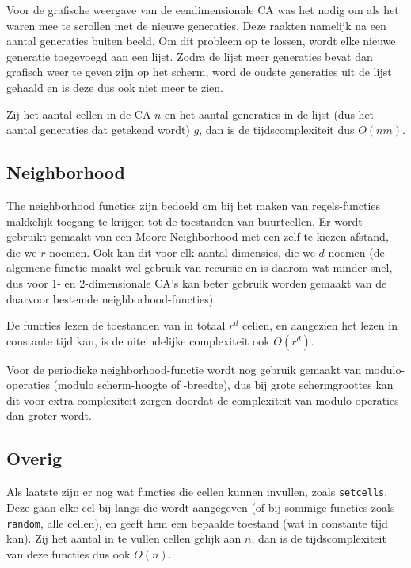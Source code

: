 \documentclass{article}
\begin{document}
Voor de grafische weergave van de eendimensionale CA was het nodig om als het waren mee te scrollen met de nieuwe generaties. Deze raakten namelijk na een aantal generaties buiten beeld. Om dit probleem op te lossen, wordt elke nieuwe generatie toegevoegd aan een lijst. Zodra de lijst meer generaties bevat dan grafisch weer te geven zijn op het scherm, word de oudste generaties uit de lijst gehaald en is deze dus ook niet meer te zien.

Zij het aantal cellen in de CA $n$ en het aantal generaties in de lijst (dus het aantal generaties dat getekend wordt) $g$, dan is de tijdscomplexiteit dus $O(nm)$.

\subsection{Neighborhood}
The neighborhood functies zijn bedoeld om bij het maken van regels-functies makkelijk toegang te krijgen tot de toestanden van buurtcellen. Er wordt gebruikt gemaakt van een Moore-Neighborhood met een zelf te kiezen afstand, die we $r$ noemen. Ook kan dit voor elk aantal dimensies, die we $d$ noemen (de algemene functie maakt wel gebruik van recursie en is daarom wat minder snel, dus voor 1- en 2-dimensionale CA's kan beter gebruik worden gemaakt van de daarvoor bestemde neighborhood-functies). 

De functies lezen de toestanden van in totaal $r^d$ cellen, en aangezien het lezen in constante tijd kan, is de uiteindelijke complexiteit ook $O(r^d)$.

Voor de periodieke neighborhood-functie wordt nog gebruik gemaakt van modulo-operaties (modulo scherm-hoogte of -breedte), dus bij grote schermgroottes kan dit voor extra complexiteit zorgen doordat de complexiteit van modulo-operaties dan groter wordt. 

\subsection{Overig}
Als laatste zijn er nog wat functies die cellen kunnen invullen, zoals \verb|setcells|. Deze gaan elke cel bij langs die wordt aangegeven (of bij sommige functies zoals \verb|random|, alle cellen), en geeft hem een bepaalde toestand (wat in constante tijd kan). Zij het aantal in te vullen cellen gelijk aan $n$, dan is de tijdscomplexiteit van deze functies dus ook $O(n)$.
\end{document}
